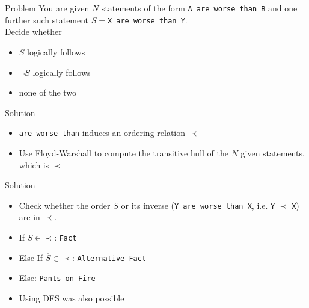 \begin{slide}
    \begin{block}{Problem}
    	You are given $N$ statements of the form \texttt{A are worse than B} and one further such statement $S=$\texttt{X are worse than Y}.\\
			Decide whether
			\begin{itemize}
				\item $S$ logically follows
				\item $\neg S$ logically follows
				\item none of the two
			\end{itemize}
	\end{block}
    \begin{block}{Solution}
			\begin{itemize}
				\item \texttt{are worse than} induces an ordering relation $\prec$
				\item Use Floyd-Warshall to compute the transitive hull of the $N$ given statements, which is $\prec$
							\end{itemize}

	\end{block}
\end{slide}
\begin{slide}
    \begin{block}{Solution}
			\begin{itemize}
					\item Check whether the order $S$ or its inverse (\texttt{Y are worse than X}, i.e. \texttt{Y} $\prec$ \texttt{X}) are in $\prec$.
				\item If $S \in \prec$: \texttt{Fact}
				\item Else If $\overline{S} \in \prec$: \texttt{Alternative Fact}
				\item Else: \texttt{Pants on Fire}
						\vspace{1cm}
				\item Using DFS was also possible
			\end{itemize}

	\end{block}
\end{slide}
